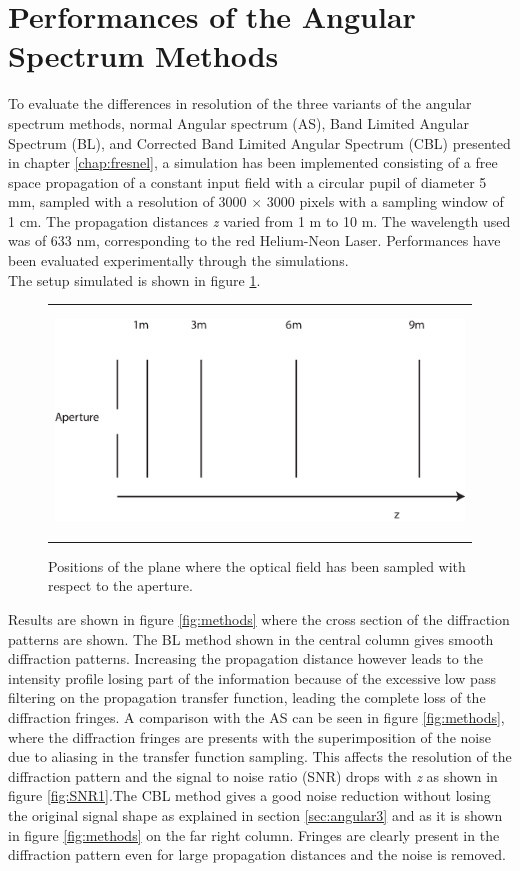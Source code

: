 \section{Performances of the Angular Spectrum Methods}
 \label{sec:perfAS}
 To evaluate the differences in resolution of the three variants of the angular spectrum methods, normal Angular spectrum (AS), Band Limited Angular Spectrum (BL), and Corrected Band Limited Angular Spectrum (CBL) presented in chapter \ref{chap:fresnel}, a simulation has been implemented consisting of a free space propagation of a constant input field with a circular pupil of diameter 5 mm, sampled with a resolution of 3000 $\times$ 3000 pixels with a sampling window of 1 cm. The propagation distances \textit{z} varied from 1 m to 10 m. The wavelength used was of 633 nm, corresponding to the red Helium-Neon Laser. Performances have been evaluated experimentally through the simulations.\\ 
 The setup simulated is shown in figure \ref{fig:setup111}.
  \begin{figure}[h]
  	\begin{center}
  		\begin{tabular}{c}
  			\includegraphics[height=6cm]{perf1.eps}
  		\end{tabular}
  	\end{center}
  	 	\caption	{ \label{fig:setup111} 
  	 		Positions of the plane where the optical field has been sampled with respect to the aperture. }
  	 \end{figure} 
 Results are shown in figure \ref{fig:methods} where the cross section of the diffraction patterns are shown. 
 The BL method shown in the central column gives smooth diffraction patterns. Increasing the propagation distance however leads to the intensity profile losing part of the information because of the excessive low pass filtering on the propagation transfer function, leading the complete loss of the diffraction fringes. A comparison with the AS can be seen in figure \ref{fig:methods}, where the diffraction fringes are presents with the superimposition of the noise due to aliasing in the transfer function sampling. This affects the resolution of the diffraction pattern and the signal to noise ratio (SNR) drops with \textit{z} as shown in figure \ref{fig:SNR1}.The CBL method gives a good noise reduction without losing the original signal shape as explained in section \ref{sec:angular3} and as it is shown in figure \ref{fig:methods} on the far right column. Fringes are clearly present in the diffraction pattern even for large propagation distances and the noise is removed. \\
